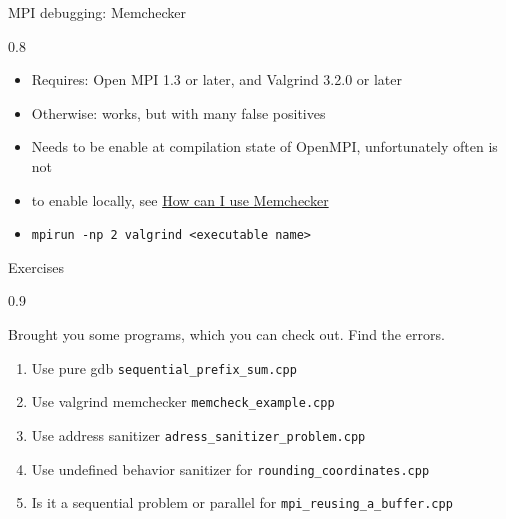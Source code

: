 \documentclass[aspectratio=1610]{beamer}
\newenvironment{centeredblock}[2][0.8\textwidth]
{ %
	\begin{center}
		\begin{varwidth}{#1} %
			\begin{block}{#2}
				\centering
			}
			{ %
			\end{block}
		\end{varwidth}
	\end{center}
}
\begin{document}
	\begin{frame}[fragile]{MPI debugging: Memchecker}
		\begin{centeredblock}{}
			\begin{itemize}
				\item Requires: Open MPI 1.3 or later, and Valgrind 3.2.0 or later
				\item Otherwise: works, but with many false positives
				\item Needs to be enable at compilation state of OpenMPI, unfortunately often is not
				\item to enable locally, see \href{https://www.open-mpi.org/faq/?category=debugging#memchecker}{How can I use Memchecker} 
				\item \texttt{mpirun -np 2 valgrind <executable name>}
			\end{itemize}
		\end{centeredblock}
	\end{frame}
	
	\begin{frame}[fragile]{Exercises}
		\begin{centeredblock}[0.9 \textwidth]{}
			Brought you some programs, which you can check out. Find the errors.
			\begin{enumerate}
				\item Use pure gdb \texttt{sequential\_prefix\_sum.cpp}
				\item Use valgrind memchecker \texttt{memcheck\_example.cpp}
				\item Use address sanitizer \texttt{adress\_sanitizer\_problem.cpp}
				\item Use undefined behavior sanitizer for \texttt{rounding\_coordinates.cpp}
				\item Is it a sequential problem or parallel for \texttt{mpi\_reusing\_a\_buffer.cpp}
			\end{enumerate}
		\end{centeredblock}
	\end{frame}
\end{document}
